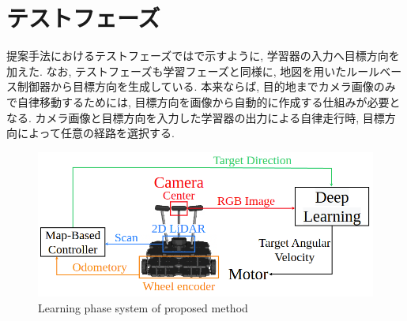 
\section{テストフェーズ}
提案手法におけるテストフェーズではで示すように, 学習器の入力へ目標方向を加えた. なお, テストフェーズも学習フェーズと同様に, 地図を用いたルールベース制御器から目標方向を生成している. 本来ならば, 目的地までカメラ画像のみで自律移動するためには, 目標方向を画像から自動的に作成する仕組みが必要となる. 
カメラ画像と目標方向を入力した学習器の出力による自律走行時, 目標方向によって任意の経路を選択する.

\vspace{3cm}

\begin{figure}[hbtp]
  \centering
 \includegraphics[keepaspectratio, scale=0.45]
      {images/suggest_test_phase.png}
 \caption{Learning phase system of proposed method}
 \label{Fig:suggest_test_phase}
\end{figure}

\newpage
